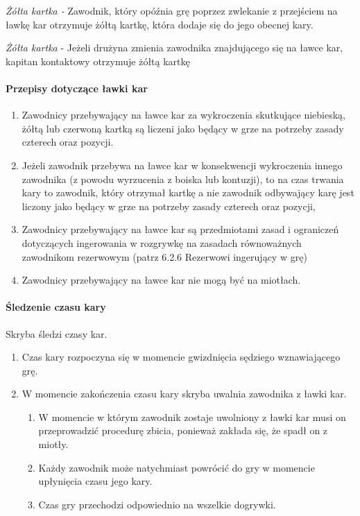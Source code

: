 \documentclass[12pt]{article}
\begin{document}
\emph{Żółta kartka -} Zawodnik, który opóźnia grę poprzez zwlekanie z
przejściem na ławkę kar otrzymuje żółtą kartkę, która dodaje się do jego
obecnej kary.

\emph{Żółta kartka} - Jeżeli drużyna zmienia zawodnika znajdującego się
na ławce kar, kapitan kontaktowy otrzymuje żółtą kartkę

\paragraph{Przepisy dotyczące ławki kar}

\begin{enumerate}
\item
    Zawodnicy przebywający na ławce kar za wykroczenia skutkujące
  niebieską, żółtą lub czerwoną kartką są liczeni jako będący w grze na
  potrzeby zasady czterech oraz pozycji.
  \item
    Jeżeli zawodnik przebywa na ławce kar w konsekwencji wykroczenia
  innego zawodnika (z powodu wyrzucenia z boiska lub kontuzji), to na
  czas trwania kary to zawodnik, który otrzymał kartkę a nie zawodnik
  odbywający karę jest liczony jako będący w grze na potrzeby zasady
  czterech oraz pozycji,
  \item
    Zawodnicy przebywający na ławce kar są przedmiotami zasad i ograniczeń
  dotyczących ingerowania w rozgrywkę na zasadach równoważnych
  zawodnikom rezerwowym (patrz 6.2.6 Rezerwowi ingerujący w grę)
  \item
    Zawodnicy przebywający na ławce kar nie mogą być na miotłach.
  \end{enumerate}

\paragraph{Śledzenie czasu kary}
Skryba śledzi czasy kar.

\begin{enumerate}
\item
    Czas kary rozpoczyna się w momencie gwizdnięcia sędziego wznawiającego
  grę.
  \item
    W momencie zakończenia czasu kary skryba uwalnia zawodnika z ławki
  kar.
  
  \begin{enumerate}
  \item
        W momencie w którym zawodnik zostaje uwolniony z ławki kar musi on
    przeprowadzić procedurę zbicia, ponieważ zakłada się, że spadł on z
    miotły.
      \item
        Każdy zawodnik może natychmiast powrócić do gry w momencie
    upłynięcia czasu jego kary.
      \item
        Czas gry przechodzi odpowiednio na wszelkie dogrywki.
      \end{enumerate}
\end{enumerate}
\end{document}
